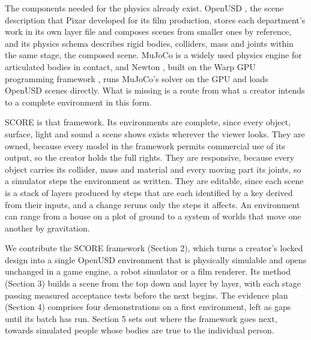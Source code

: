 The components needed for the physics already exist. OpenUSD \citep{openusd}, the scene description that Pixar developed for its film production, stores each department's work in its own layer file and composes scenes from smaller ones by reference, and its physics schema describes rigid bodies, colliders, mass and joints within the same stage, the composed scene. MuJoCo \citep{todorov2012mujoco} is a widely used physics engine for articulated bodies in contact, and Newton \citep{newton}, built on the Warp GPU programming framework \citep{warp}, runs MuJoCo's solver on the GPU \citep{mujocowarp} and loads OpenUSD scenes directly. What is missing is a route from what a creator intends to a complete environment in this form.

SCORE is that framework. Its environments are complete, since every object, surface, light and sound a scene shows exists wherever the viewer looks. They are owned, because every model in the framework permits commercial use of its output, so the creator holds the full rights. They are responsive, because every object carries its collider, mass and material and every moving part its joints, so a simulator steps the environment as written. They are editable, since each scene is a stack of layers produced by steps that are each identified by a key derived from their inputs, and a change reruns only the steps it affects. An environment can range from a house on a plot of ground to a system of worlds that move one another by gravitation.

We contribute the SCORE framework (Section 2), which turns a creator's locked design into a single OpenUSD environment that is physically simulable and opens unchanged in a game engine, a robot simulator or a film renderer. Its method (Section 3) builds a scene from the top down and layer by layer, with each stage passing measured acceptance tests before the next begins. The evidence plan (Section 4) comprises four demonstrations on a first environment, left as gaps until its batch has run. Section 5 sets out where the framework goes next, towards simulated people whose bodies are true to the individual person.
